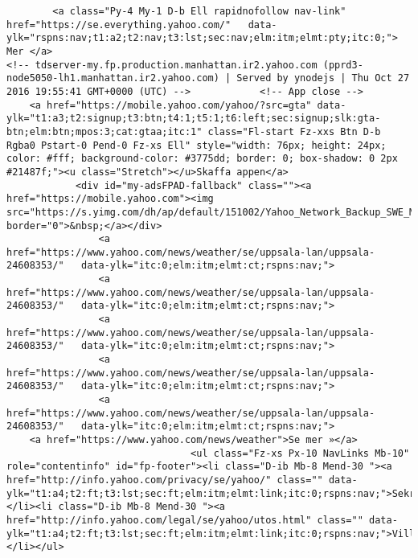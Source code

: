 \begin{verbatim}
        <a class="Py-4 My-1 D-b Ell rapidnofollow nav-link" href="https://se.everything.yahoo.com/"   data-ylk="rspns:nav;t1:a2;t2:nav;t3:lst;sec:nav;elm:itm;elmt:pty;itc:0;"> Mer </a>
<!-- tdserver-my.fp.production.manhattan.ir2.yahoo.com (pprd3-node5050-lh1.manhattan.ir2.yahoo.com) | Served by ynodejs | Thu Oct 27 2016 19:55:41 GMT+0000 (UTC) -->            <!-- App close -->
    <a href="https://mobile.yahoo.com/yahoo/?src=gta" data-ylk="t1:a3;t2:signup;t3:btn;t4:1;t5:1;t6:left;sec:signup;slk:gta-btn;elm:btn;mpos:3;cat:gtaa;itc:1" class="Fl-start Fz-xxs Btn D-b Rgba0 Pstart-0 Pend-0 Fz-xs Ell" style="width: 76px; height: 24px; color: #fff; background-color: #3775dd; border: 0; box-shadow: 0 2px #21487f;"><u class="Stretch"></u>Skaffa appen</a>
            <div id="my-adsFPAD-fallback" class=""><a href="https://mobile.yahoo.com"><img src="https://s.yimg.com/dh/ap/default/151002/Yahoo_Network_Backup_SWE_MPU_300x250.jpg" border="0">&nbsp;</a></div>
                <a href="https://www.yahoo.com/news/weather/se/uppsala-lan/uppsala-24608353/"   data-ylk="itc:0;elm:itm;elmt:ct;rspns:nav;">
                <a href="https://www.yahoo.com/news/weather/se/uppsala-lan/uppsala-24608353/"   data-ylk="itc:0;elm:itm;elmt:ct;rspns:nav;">
                <a href="https://www.yahoo.com/news/weather/se/uppsala-lan/uppsala-24608353/"   data-ylk="itc:0;elm:itm;elmt:ct;rspns:nav;">
                <a href="https://www.yahoo.com/news/weather/se/uppsala-lan/uppsala-24608353/"   data-ylk="itc:0;elm:itm;elmt:ct;rspns:nav;">
                <a href="https://www.yahoo.com/news/weather/se/uppsala-lan/uppsala-24608353/"   data-ylk="itc:0;elm:itm;elmt:ct;rspns:nav;">
    <a href="https://www.yahoo.com/news/weather">Se mer »</a>
                                <ul class="Fz-xs Px-10 NavLinks Mb-10" role="contentinfo" id="fp-footer"><li class="D-ib Mb-8 Mend-30 "><a href="http://info.yahoo.com/privacy/se/yahoo/" class="" data-ylk="t1:a4;t2:ft;t3:lst;sec:ft;elm:itm;elmt:link;itc:0;rspns:nav;">Sekretess</a></li><li class="D-ib Mb-8 Mend-30 "><a href="http://info.yahoo.com/legal/se/yahoo/utos.html" class="" data-ylk="t1:a4;t2:ft;t3:lst;sec:ft;elm:itm;elmt:link;itc:0;rspns:nav;">Villkor</a></li></ul>

\end{verbatim}
